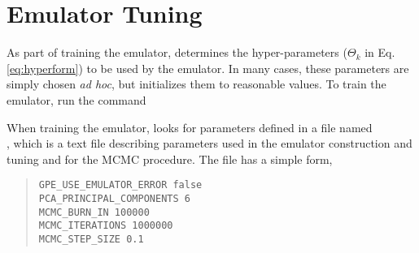 \section{Emulator Tuning}

As part of training the emulator,  determines the hyper-parameters ($\Theta_k$ in Eq. \eqref{eq:hyperform}) to be used by the emulator. In many cases, these parameters are simply chosen \emph{ad hoc}, but  initializes them to reasonable values. To train the emulator, run the command


When training the emulator,  looks for parameters defined in a file named\\ , which is a text file describing parameters used in the emulator construction and tuning and for the MCMC procedure. The file has a simple form, 

\begin{quote}
{\tt GPE\_USE\_EMULATOR\_ERROR false}\\
{\tt PCA\_PRINCIPAL\_COMPONENTS 6}\\
{\tt MCMC\_BURN\_IN 100000}\\
{\tt MCMC\_ITERATIONS 1000000}\\
{\tt MCMC\_STEP\_SIZE 0.1}
\end{quote}

